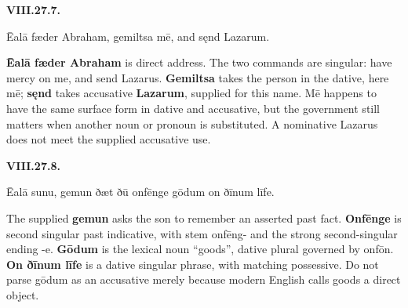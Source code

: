 \par\begin{minipage}{\linewidth}\raggedright
\textbf{VIII.27.7.}

Ēalā fæder Abraham, gemiltsa mē, and sęnd Lazarum.

\textbf{Ēalā fæder Abraham} is direct address. The two commands are singular: have mercy on me, and send Lazarus. \textbf{Gemiltsa} takes the person in the dative, here mē; \textbf{sęnd} takes accusative \textbf{Lazarum}, supplied for this name. Mē happens to have the same surface form in dative and accusative, but the government still matters when another noun or pronoun is substituted. A nominative Lazarus does not meet the supplied accusative use.

\end{minipage}\par\addvspace{4pt}

\par\begin{minipage}{\linewidth}\raggedright
\textbf{VIII.27.8.}

Ēalā sunu, gemun ðæt ðū onfēnge gōdum on ðīnum līfe.

The supplied \textbf{gemun} asks the son to remember an asserted past fact. \textbf{Onfēnge} is second singular past indicative, with stem onfēng- and the strong second-singular ending -e. \textbf{Gōdum} is the lexical noun “goods”, dative plural governed by onfōn. \textbf{On ðīnum līfe} is a dative singular phrase, with matching possessive. Do not parse gōdum as an accusative merely because modern English calls goods a direct object.

\end{minipage}\par\addvspace{4pt}

